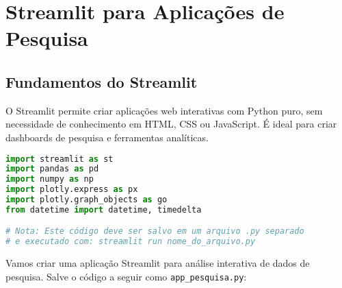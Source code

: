 \section{Streamlit para Aplicações de Pesquisa}

\subsection{Fundamentos do Streamlit}

O Streamlit permite criar aplicações web interativas com Python puro, sem necessidade de conhecimento em HTML, CSS ou JavaScript. É ideal para criar dashboards de pesquisa e ferramentas analíticas.

\begin{pythonbox}
\begin{lstlisting}[language=Python]
import streamlit as st
import pandas as pd
import numpy as np
import plotly.express as px
import plotly.graph_objects as go
from datetime import datetime, timedelta

# Nota: Este código deve ser salvo em um arquivo .py separado
# e executado com: streamlit run nome_do_arquivo.py
\end{lstlisting}
\end{pythonbox}

\begin{examplebox}
Vamos criar uma aplicação Streamlit para análise interativa de dados de pesquisa. Salve o código a seguir como \texttt{app\_pesquisa.py}:
\end{examplebox}

